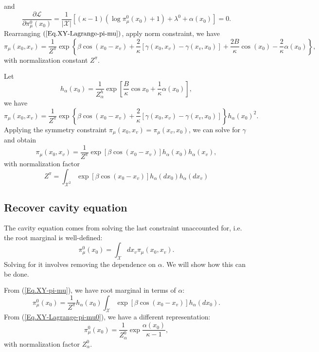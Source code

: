 \documentclass[12pt]{article}
\numberwithin{equation}{section}
\begin{document}
and
\begin{equation}
    \label{Eq.XY-Lagrange-pi-mu0}
    \frac{\partial\mathcal{L}}{\partial\pi_\mu^0(x_0)} = \frac{1}{|\mathcal{X}|} \left[(\kappa-1)(\log\pi_\mu^0(x_0)+1) + \lambda^0 + \alpha(x_0)\right]=0.
\end{equation}
Rearranging $(\ref{Eq.XY-Lagrange-pi-mu})$, apply norm constraint, we have
\begin{equation*}
    \pi_\mu(x_0, x_v) = \frac1{Z^\pi}\exp\left\{\beta\cos(x_0- x_v)+\frac2\kappa[\gamma(x_0, x_v) - \gamma(x_v, x_0)] + \frac{2B}{\kappa}\cos(x_0) - \frac2\kappa\alpha(x_0)\right\},
\end{equation*}
with normalization constant $Z^\pi$.

Let
\begin{equation}
    h_\alpha(x_0)=\frac{1}{Z^h_\alpha}\exp\left[\frac{B}{\kappa}\cos x_0 + \frac1\kappa \alpha(x_0)\right],
    \label{Eq.XY-hdef-alpha}
\end{equation}
we have
\begin{equation*}
    \pi_\mu(x_0, x_v) = \frac1{Z^\pi}\exp\left\{\beta\cos(x_0- x_v)+\frac2\kappa[\gamma(x_0, x_v) - \gamma(x_v, x_0)]\right\}h_\alpha(x_0)^2.
\end{equation*}
Applying the symmetry constraint $\pi_\mu(x_0, x_v) = \pi_\mu(x_v, x_0)$, we can solve for $\gamma$ and obtain
\begin{equation}
    \pi_\mu(x_0, x_v) = \frac1{Z^\pi}\exp\left[\beta\cos(x_0- x_v)\right]h_\alpha(x_0)h_\alpha(x_v),
    \label{Eq.XY-pi-mu}
\end{equation}
with normalization factor
\begin{equation}
    \label{Eq.XY-Zpi}
    Z^\pi = \int_{\mathcal{X}^2} \exp\left[\beta\cos(x_0- x_v)\right]h_\alpha(dx_0)h_\alpha(dx_v)
\end{equation}

\subsection{Recover cavity equation}

The cavity equation comes from solving the last constraint unaccounted for, i.e. the root marginal is well-defined:
\begin{equation*}
    \pi_\mu^0(x_0) = \int_{\mathcal{X}} dx_v \pi_\mu(x_0, x_v).
\end{equation*}
Solving for it involves removing the dependence on $\alpha$. We will show how this can be done.

From (\ref{Eq.XY-pi-mu}), we have root marginal in terms of $\alpha$:
\begin{equation}
    \pi_\mu^0(x_0) = \frac1{Z^\pi}h_\alpha(x_0)\int_{\mathcal{X}}\exp[\beta\cos(x_0-x_v)]h_\alpha(dx_0).
    \label{Eq.XY-pi-mu0-alpha}
\end{equation}
From (\ref{Eq.XY-Lagrange-pi-mu0}), we have a different representation:
\begin{equation*}
    \pi_\mu^0(x_0) = \frac{1}{Z^0_\alpha}\exp\frac{\alpha(x_0)}{\kappa-1},
\end{equation*}
with normalization factor $Z^0_\alpha$.
\end{document}
